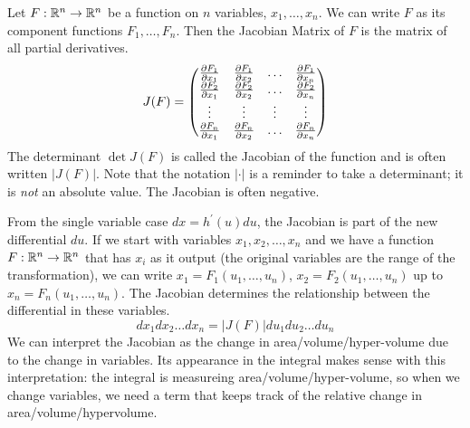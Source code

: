 \documentclass[fleqn,letterpaper]{report}
\begin{document}
\begin{defn}
Let $F: \mathbb{R}^n \rightarrow \mathbb{R}^n$ be a function on $n$
variables, $x_1, \ldots, x_n$. We can write $F$ as its
component functions $F_1, \ldots, F_n$. Then the Jacobian
Matrix of $F$ is the matrix of all partial derivatives.
\begin{equation*}
J(F) = \left( \begin{matrix}
\frac{\partial F_1}{\partial x_1} & 
\frac{\partial F_1}{\partial x_2} & 
\ldots & 
\frac{\partial F_1}{\partial x_n} \\
\frac{\partial F_2}{\partial x_1} & 
\frac{\partial F_2}{\partial x_2} & 
\ldots & 
\frac{\partial F_2}{\partial x_n} \\
\vdots & \vdots & \vdots & \vdots \\
\frac{\partial F_n}{\partial x_1} & 
\frac{\partial F_n}{\partial x_2} & 
\ldots & 
\frac{\partial F_n}{\partial x_n} \end{matrix} \right) 
\end{equation*}
The determinant $\det J(F)$ is called the Jacobian of the
function and is often written $|J(F)|$. Note that the
notation $|\cdot|$ is a reminder to take a determinant; it is
\emph{not} an absolute value. The Jacobian is often
negative.
\end{defn}

From the single variable case $dx = h^\prime(u) du$, the
Jacobian is part of the new differential $du$. 
If we start with variables $x_1, x_2, \ldots, x_n$ and we have
a function $F: \mathbb{R}^n \rightarrow \mathbb{R}^n$ that has $x_i$ as it
output (the original variables are the range of the
transformation), we can write $x_1 = F_1(u_1,
\ldots, u_n)$, $x_2 = F_2(u_1, \ldots, u_n)$ up to $x_n =
F_n(u_1, \ldots, u_n)$. The Jacobian determines the
relationship between the differential in these variables.
\begin{equation*}
dx_1 dx_2 \ldots dx_n = |J(F)| du_1 du_2 \ldots du_n 
\end{equation*}
We can interpret the Jacobian as the change in
area/volume/hyper-volume due to the change in variables. Its
appearance in the integral makes sense with this
interpretation: the integral is measureing
area/volume/hyper-volume, so when we change variables, we need
a term that keeps track of the relative change in
area/volume/hypervolume.
\end{document}
